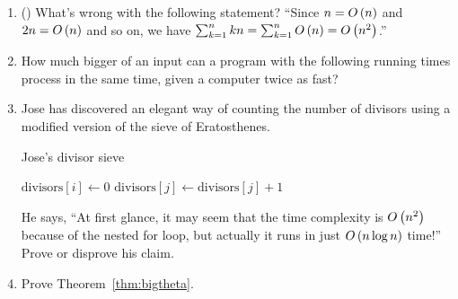 \begin{exercises}
\begin{enumerate}
    \item (\cite{graham_concrete_1994}) What's wrong with the following statement? ``Since $n = O\left(n \right)$ and $2n = O\left(n \right)$ and so on, we have $\sum_{k=1}^n kn = \sum_{k=1}^n O\left(n \right) = O\left(n^2 \right)$.''
    
    \item How much bigger of an input can a program with the following running times process in the same time, given a computer twice as fast?
    
    \noindent

    \item [\challenge] Jose has discovered an elegant way of counting the number of divisors using a modified version of the sieve of Eratosthenes.
    
    \begin{algorithm}[H]
        \caption{Jose's divisor sieve}
        \begin{algorithmic}[1]
                \State $\mathrm{divisors}[i] \gets 0$
            \EndFor
                    \State $\mathrm{divisors}[j] \gets \mathrm{divisors}[j] + 1$
                \EndFor
            \EndFor
            \EndFunction
        \end{algorithmic}
    \end{algorithm}
    
    He says, ``At first glance, it may seem that the time complexity is $O\left(n^2 \right)$ because of the nested for loop, but actually it runs in just $O\left(n \log n \right)$ time!'' Prove or disprove his claim.
    
    \item [\challenge] Prove Theorem~\ref{thm:bigtheta}.
    
\end{enumerate}
\end{exercises}